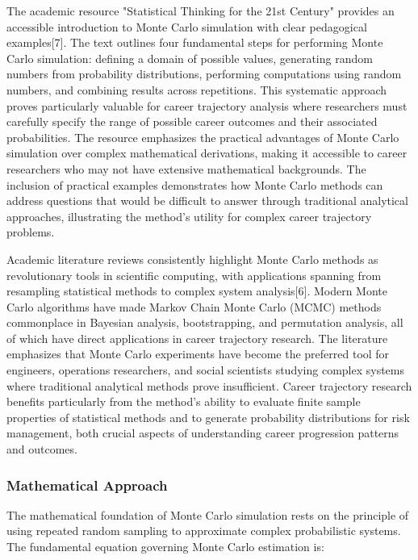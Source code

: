 \documentclass[main.tex]{subfiles}
\begin{document}
The academic resource "Statistical Thinking for the 21st Century" provides an accessible introduction to Monte Carlo simulation with clear pedagogical examples[7]. The text outlines four fundamental steps for performing Monte Carlo simulation: defining a domain of possible values, generating random numbers from probability distributions, performing computations using random numbers, and combining results across repetitions. This systematic approach proves particularly valuable for career trajectory analysis where researchers must carefully specify the range of possible career outcomes and their associated probabilities. The resource emphasizes the practical advantages of Monte Carlo simulation over complex mathematical derivations, making it accessible to career researchers who may not have extensive mathematical backgrounds. The inclusion of practical examples demonstrates how Monte Carlo methods can address questions that would be difficult to answer through traditional analytical approaches, illustrating the method's utility for complex career trajectory problems.


Academic literature reviews consistently highlight Monte Carlo methods as revolutionary tools in scientific computing, with applications spanning from resampling statistical methods to complex system analysis[6]. Modern Monte Carlo algorithms have made Markov Chain Monte Carlo (MCMC) methods commonplace in Bayesian analysis, bootstrapping, and permutation analysis, all of which have direct applications in career trajectory research. The literature emphasizes that Monte Carlo experiments have become the preferred tool for engineers, operations researchers, and social scientists studying complex systems where traditional analytical methods prove insufficient. Career trajectory research benefits particularly from the method's ability to evaluate finite sample properties of statistical methods and to generate probability distributions for risk management, both crucial aspects of understanding career progression patterns and outcomes.

\subsubsection{Mathematical Approach}

The mathematical foundation of Monte Carlo simulation rests on the principle of using repeated random sampling to approximate complex probabilistic systems. The fundamental equation governing Monte Carlo estimation is:
\end{document}
